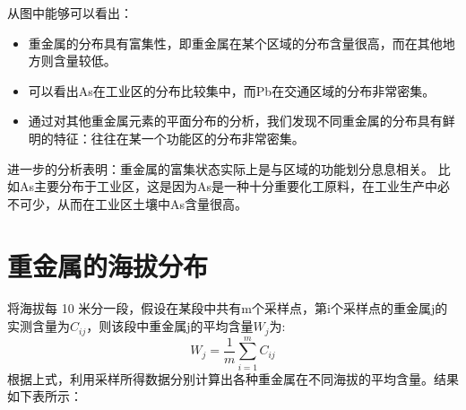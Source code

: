 \documentclass[a4paper]{article}
\begin{document}
从图中能够可以看出：
\begin{itemize}
\item 重金属的分布具有富集性，即重金属在某个区域的分布含量很高，而在其他地方则含量较低。 
\item 可以看出As在工业区的分布比较集中，而Pb在交通区域的分布非常密集。                
\item 通过对其他重金属元素的平面分布的分析，我们发现不同重金属的分布具有鲜明的特征：往往在某一个功能区的分布非常密集。 
\end{itemize}
进一步的分析表明：重金属的富集状态实际上是与区域的功能划分息息相关。
比如As主要分布于工业区，这是因为As是一种十分重要化工原料，在工业生产中必不可少，从而在工业区土壤中As含量很高。

\section{重金属的海拔分布}
将海拔每 10 米分一段，假设在某段中共有m个采样点，第i个采样点的重金属j的实测含量为$C_{ij}$，则该段中重金属j的平均含量$W_j$为:
\begin{equation}
W_j=\frac{1}{m}\sum_{i=1}^m C_{ij}
\end{equation}
根据上式，利用采样所得数据分别计算出各种重金属在不同海拔的平均含量。结果如下表所示：
\end{document}
